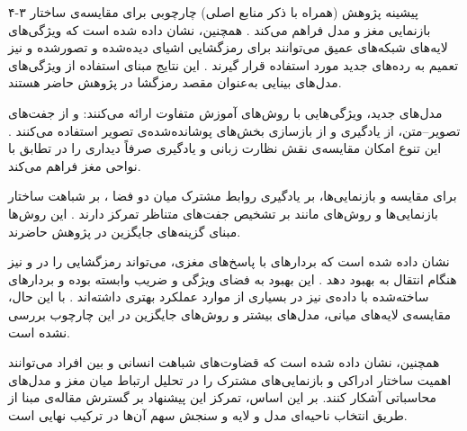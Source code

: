 \documentclass{ut-proposal}
\begin{document}
	\begin{UTProposalSection}{۴-۳ پیشینه پژوهش (همراه با ذکر منابع اصلی)}
 چارچوبی برای مقایسه‌ی ساختار بازنمایی مغز و مدل فراهم می‌کند \lr{[2]}. همچنین، نشان داده شده است که ویژگی‌های لایه‌های شبکه‌های عمیق می‌توانند برای رمزگشایی اشیای دیده‌شده و تصورشده و نیز تعمیم به رده‌های جدید مورد استفاده قرار گیرند \lr{[4]}. این نتایج مبنای استفاده از ویژگی‌های مدل‌های بینایی به‌عنوان مقصد رمزگشا در پژوهش حاضر هستند.

مدل‌های جدید، ویژگی‌هایی با روش‌های آموزش متفاوت ارائه می‌کنند:  و  از جفت‌های تصویر–متن،  از یادگیری  و  از بازسازی بخش‌های پوشانده‌شده‌ی تصویر استفاده می‌کنند \lr{[5--8]}. این تنوع امکان مقایسه‌ی نقش نظارت زبانی و یادگیری صرفاً دیداری را در تطابق با نواحی مغز فراهم می‌کند.

برای مقایسه و  بازنمایی‌ها،  بر یادگیری روابط مشترک میان دو فضا \lr{[9]}،  بر شباهت ساختار بازنمایی‌ها \lr{[10]} و روش‌های  مانند  بر تشخیص جفت‌های متناظر تمرکز دارند \lr{[11]}. این روش‌ها مبنای گزینه‌های جایگزین  در پژوهش حاضرند.

نشان داده شده است که  بردارهای  با  پاسخ‌های مغزی، می‌تواند رمزگشایی  را در  و نیز هنگام انتقال به  بهبود دهد \lr{[1]}. این بهبود به فضای ویژگی و ضریب  وابسته بوده و بردارهای ساخته‌شده با داده‌ی  نیز در بسیاری از موارد عملکرد بهتری داشته‌اند \lr{[1]}. با این حال، مقایسه‌ی لایه‌های میانی، مدل‌های بیشتر و روش‌های جایگزین  در این چارچوب بررسی نشده است.

همچنین، نشان داده شده است که قضاوت‌های شباهت انسانی \lr{[12]} و  بین افراد \lr{[13]} می‌توانند اهمیت ساختار ادراکی و بازنمایی‌های مشترک را در تحلیل ارتباط میان مغز و مدل‌های محاسباتی آشکار کنند. بر این اساس، تمرکز این پیشنهاد بر گسترش مقاله‌ی مبنا از طریق انتخاب ناحیه‌ای مدل و لایه و سنجش سهم آن‌ها در ترکیب نهایی است.

	\end{UTProposalSection}
\end{document}
